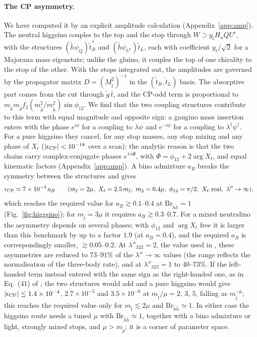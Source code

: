 \documentclass[11pt]{article}
\begin{document}
\paragraph*{The CP asymmetry.} We have computed it by an explicit amplitude calculation (Appendix~\ref{app:amp}). The neutral higgsino couples to the top and the stop through $W\supset y_tH_uQU^c$, with the structures $(\tilde h\psi_Q)\tilde t_R^*$ and $(\tilde h\psi_{U^c})\tilde t_L$, each with coefficient $y_t/\sqrt2$ for a Majorana mass eigenstate; unlike the gluino, it couples the top of one chirality to the stop of the other. With the stops integrated out, the amplitudes are governed by the propagator matrix $D=(M^2_{\tilde t})^{-1}$ in the $(\tilde t_R,\tilde t_L)$ basis. The absorptive part comes from the cut through $\tilde g\,\bar t$, and the CP-odd term is proportional to $m_{\tilde h}m_{\tilde g}f_2(m_{\tilde g}^2/m_{\tilde h}^2)\sin\phi_{12}$. We find that the two coupling structures contribute to this term with equal magnitude and opposite sign: a gaugino mass insertion enters with the phase $e^{i\phi}$ for a coupling to $\lambda\psi$ and $e^{-i\phi}$ for a coupling to $\lambda^\dagger\psi^\dagger$. For a pure higgsino they cancel, for any stop masses, any stop mixing and any phase of $X_t$ ($|\epsilon_{\rm CP}|<10^{-18}$ over a scan); the analytic reason is that the two chains carry complex-conjugate phases $e^{\mp i\Phi}$, with $\Phi=\phi_{12}+2\arg X_t$, and equal kinematic factors (Appendix~\ref{app:amp}). A bino admixture $a_B$ breaks the symmetry between the structures and gives
\begin{equation}
\epsilon_{\rm CP}\simeq7\times10^{-4}\,a_B\qquad(m_{\tilde t}=2\mu,\ X_t=2.5\,m_{\tilde t},\ m_{\tilde g}=0.4\mu,\ \phi_{12}=\pi/2,\ X_t\ \mathrm{real},\ \lambda''\to\infty),
\end{equation}
which reaches the required value for $a_B\gtrsim0.1$--$0.4$ at $\mathrm{Br}_{\tilde h\tilde h}=1$ (Fig.~\ref{fig:higgsino}); for $m_{\tilde t}=3\mu$ it requires $a_B\gtrsim0.3$--$0.7$. For a mixed neutralino the asymmetry depends on several phases; with $\phi_{12}$ and $\arg X_t$ free it is larger than this benchmark by up to a factor $1.9$ (at $a_B=0.4$), and the required $a_B$ is correspondingly smaller, $\gtrsim0.05$--$0.2$. At $\lambda''_{323}=2$, the value used in \cite{KW}, these asymmetries are reduced to $73$--$91\%$ of the $\lambda''\to\infty$ values (the range reflects the normalisation of the three-body rate), and at $\lambda''_{323}=1$ to $40$--$73\%$. If the left-handed term instead entered with the same sign as the right-handed one, as in Eq.~(41) of \cite{KW}, the two structures would add and a pure higgsino would give $|\epsilon_{\rm CP}|\le1.4\times10^{-4}$, $2.7\times10^{-5}$ and $3.5\times10^{-6}$ at $m_{\tilde t}/\mu=2,\,3,\,5$, falling as $m_{\tilde t}^{-6}$; this reaches the required value only for $m_{\tilde t}\lesssim2\mu$ and $\mathrm{Br}_{\tilde h\tilde h}\simeq1$. In either case the higgsino route needs a tuned $\mu$ with $\mathrm{Br}_{\tilde h\tilde h}\simeq1$, together with a bino admixture or light, strongly mixed stops, and $\mu>m_{\tilde g}$; it is a corner of parameter space.
\end{document}
